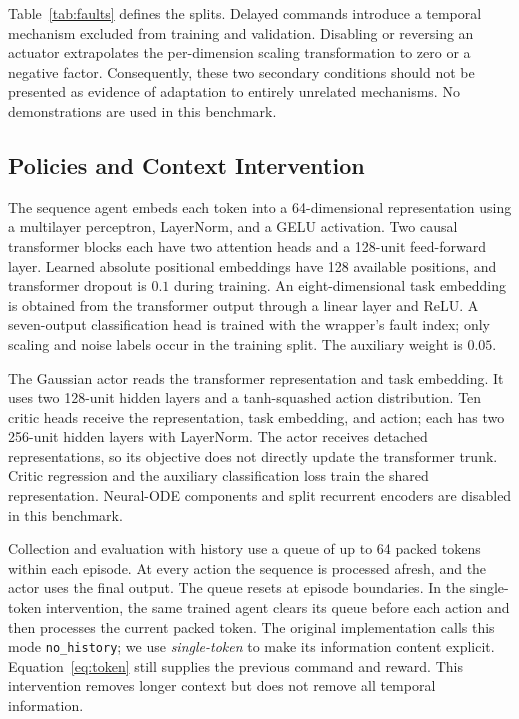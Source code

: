 \documentclass[runningheads]{llncs}
\begin{document}
Table~\ref{tab:faults} defines the splits. Delayed commands introduce a temporal mechanism excluded from training and validation. Disabling or reversing an actuator extrapolates the per-dimension scaling transformation to zero or a negative factor. Consequently, these two secondary conditions should not be presented as evidence of adaptation to entirely unrelated mechanisms. No demonstrations are used in this benchmark.

\subsection{Policies and Context Intervention}
The sequence agent embeds each token into a 64-dimensional representation using a multilayer perceptron, LayerNorm, and a GELU activation. Two causal transformer blocks each have two attention heads and a 128-unit feed-forward layer. Learned absolute positional embeddings have 128 available positions, and transformer dropout is $0.1$ during training. An eight-dimensional task embedding is obtained from the transformer output through a linear layer and ReLU. A seven-output classification head is trained with the wrapper's fault index; only scaling and noise labels occur in the training split. The auxiliary weight is $0.05$.

The Gaussian actor reads the transformer representation and task embedding. It uses two 128-unit hidden layers and a tanh-squashed action distribution. Ten critic heads receive the representation, task embedding, and action; each has two 256-unit hidden layers with LayerNorm. The actor receives detached representations, so its objective does not directly update the transformer trunk. Critic regression and the auxiliary classification loss train the shared representation. Neural-ODE components and split recurrent encoders are disabled in this benchmark.

Collection and evaluation with history use a queue of up to 64 packed tokens within each episode. At every action the sequence is processed afresh, and the actor uses the final output. The queue resets at episode boundaries. In the single-token intervention, the same trained agent clears its queue before each action and then processes the current packed token. The original implementation calls this mode \texttt{no\_history}; we use \emph{single-token} to make its information content explicit. Equation~\ref{eq:token} still supplies the previous command and reward. This intervention removes longer context but does not remove all temporal information.
\end{document}
